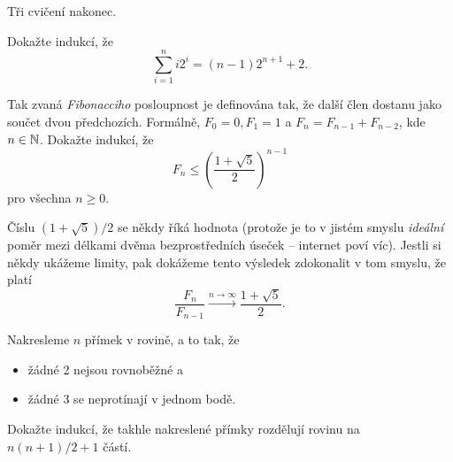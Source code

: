 Tři cvičení nakonec.
\newpage
\begin{exercise}
 Dokažte indukcí, že
 \[
  \sum_{i=1}^{n} i 2^{i} = (n - 1)2^{n+1} + 2.
 \]
\end{exercise}

\begin{exercise}
 Tak zvaná \emph{Fibonacciho} posloupnost je definována tak, že další člen
 dostanu jako součet dvou předchozích. Formálně, $F_0 = 0, F_1 = 1$ a $F_n =
 F_{n - 1} + F_{n - 2}$, kde $n \in \mathbb{N}$. Dokažte indukcí, že
 \[
  F_n \leq \left( \frac{1+\sqrt{5}}{2} \right) ^{n-1}
 \]
 pro všechna $n \geq 0$.

 Číslu  $(1+\sqrt{5}) / 2$ se někdy říká hodnota  (protože je
 to v jistém smyslu \emph{ideální} poměr mezi délkami dvěma bezprostředních
 úseček -- internet poví víc). Jestli si někdy ukážeme limity, pak dokážeme
 tento výsledek zdokonalit v tom smyslu, že platí
 \[
  \frac{F_n}{F_{n-1}} \xrightarrow{n \to \infty} \frac{1+\sqrt{5}}{2}. 
 \]
\end{exercise}

\begin{exercise}
 Nakresleme $n$ přímek v rovině, a to tak, že
 \begin{itemize}
  \item žádné 2 nejsou rovnoběžné a
  \item žádné 3 se neprotínají v jednom bodě.
 \end{itemize}
 Dokažte indukcí, že takhle nakreslené přímky rozdělují rovinu na $n(n+1) / 2 +
 1$ částí.
\end{exercise}
